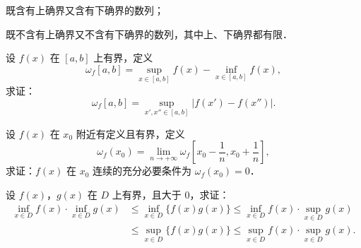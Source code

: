 \begin{xiti}
\begin{ziti}
\item 既含有上确界又含有下确界的数列；
\item 既不含有上确界又不含有下确界的数列，其中上、下确界都有限．
\end{ziti}
\item 设 $f(x)$ 在 $[a, b]$ 上有界，定义
\[
\omega_f[a, b] = \sup_{x \in [a, b]} f(x) - \inf_{x \in [a, b]} f(x),
\]
求证：
\[
\omega_f[a, b] = \sup_{x', x'' \in [a, b]} |f(x') - f(x'')|.
\]
\item 设 $f(x)$ 在 $x_0$ 附近有定义且有界，定义
\[
\omega_f(x_0) = \lim_{n \to +\infty} \omega_f\left[ x_0 - \frac{1}{n}, x_0 + \frac{1}{n} \right],
\]
求证：$f(x)$ 在 $x_0$ 连续的充分必要条件为 $\omega_f(x_0) = 0$．
\item 设 $f(x)$，$g(x)$ 在 $D$ 上有界，且大于 $0$，求证：
\begin{align*}
\inf_{x \in D} f(x) \cdot \inf_{x \in D} g(x) &\leqslant \inf_{x \in D} \{ f(x) g(x) \} \leqslant \inf_{x \in D} f(x) \cdot \sup_{x \in D} g(x) \\
&\leqslant \sup_{x \in D} \{ f(x) g(x) \} \leqslant \sup_{x \in D} f(x) \cdot \sup_{x \in D} g(x).
\end{align*}
\end{xiti}
